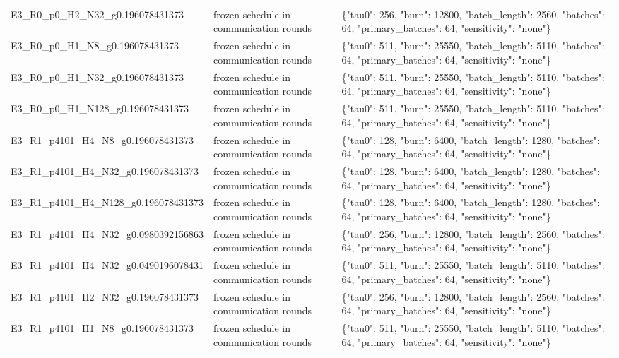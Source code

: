 \begin{tabular}{lll}
E3\_R0\_p0\_H2\_N32\_g0.196078431373 & frozen schedule in communication rounds & \{"tau0": 256, "burn": 12800, "batch\_length": 2560, "batches": 64, "primary\_batches": 64, "sensitivity": "none"\} \\
E3\_R0\_p0\_H1\_N8\_g0.196078431373 & frozen schedule in communication rounds & \{"tau0": 511, "burn": 25550, "batch\_length": 5110, "batches": 64, "primary\_batches": 64, "sensitivity": "none"\} \\
E3\_R0\_p0\_H1\_N32\_g0.196078431373 & frozen schedule in communication rounds & \{"tau0": 511, "burn": 25550, "batch\_length": 5110, "batches": 64, "primary\_batches": 64, "sensitivity": "none"\} \\
E3\_R0\_p0\_H1\_N128\_g0.196078431373 & frozen schedule in communication rounds & \{"tau0": 511, "burn": 25550, "batch\_length": 5110, "batches": 64, "primary\_batches": 64, "sensitivity": "none"\} \\
E3\_R1\_p4101\_H4\_N8\_g0.196078431373 & frozen schedule in communication rounds & \{"tau0": 128, "burn": 6400, "batch\_length": 1280, "batches": 64, "primary\_batches": 64, "sensitivity": "none"\} \\
E3\_R1\_p4101\_H4\_N32\_g0.196078431373 & frozen schedule in communication rounds & \{"tau0": 128, "burn": 6400, "batch\_length": 1280, "batches": 64, "primary\_batches": 64, "sensitivity": "none"\} \\
E3\_R1\_p4101\_H4\_N128\_g0.196078431373 & frozen schedule in communication rounds & \{"tau0": 128, "burn": 6400, "batch\_length": 1280, "batches": 64, "primary\_batches": 64, "sensitivity": "none"\} \\
E3\_R1\_p4101\_H4\_N32\_g0.0980392156863 & frozen schedule in communication rounds & \{"tau0": 256, "burn": 12800, "batch\_length": 2560, "batches": 64, "primary\_batches": 64, "sensitivity": "none"\} \\
E3\_R1\_p4101\_H4\_N32\_g0.0490196078431 & frozen schedule in communication rounds & \{"tau0": 511, "burn": 25550, "batch\_length": 5110, "batches": 64, "primary\_batches": 64, "sensitivity": "none"\} \\
E3\_R1\_p4101\_H2\_N32\_g0.196078431373 & frozen schedule in communication rounds & \{"tau0": 256, "burn": 12800, "batch\_length": 2560, "batches": 64, "primary\_batches": 64, "sensitivity": "none"\} \\
E3\_R1\_p4101\_H1\_N8\_g0.196078431373 & frozen schedule in communication rounds & \{"tau0": 511, "burn": 25550, "batch\_length": 5110, "batches": 64, "primary\_batches": 64, "sensitivity": "none"\} \\

\end{tabular}
